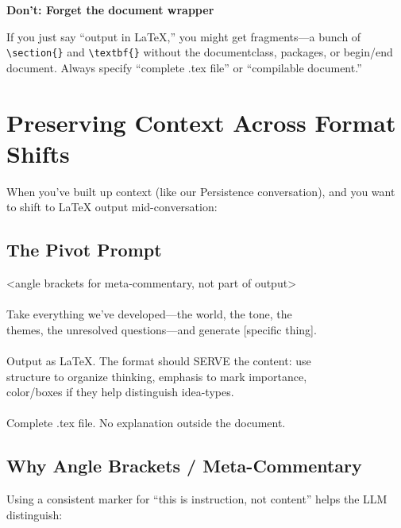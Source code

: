 \documentclass[11pt,letterpaper]{article}
\begin{document}
\begin{tcolorbox}[warnbox]
\textbf{Don't: Forget the document wrapper}

If you just say ``output in LaTeX,'' you might get fragments---a bunch of \verb|\section{}| and \verb|\textbf{}| without the documentclass, packages, or begin/end document. Always specify ``complete .tex file'' or ``compilable document.''
\end{tcolorbox}

\section{Preserving Context Across Format Shifts}

When you've built up context (like our Persistence conversation), and you want to shift to LaTeX output mid-conversation:

\subsection{The Pivot Prompt}

\begin{tcolorbox}[promptbox]
<angle brackets for meta-commentary, not part of output>\\
\\
Take everything we've developed---the world, the tone, the \\
themes, the unresolved questions---and generate [specific thing].\\
\\
Output as LaTeX. The format should SERVE the content: use \\
structure to organize thinking, emphasis to mark importance, \\
color/boxes if they help distinguish idea-types.\\
\\
Complete .tex file. No explanation outside the document.
\end{tcolorbox}

\subsection{Why Angle Brackets / Meta-Commentary}

Using a consistent marker for ``this is instruction, not content'' helps the LLM distinguish:
\end{document}
